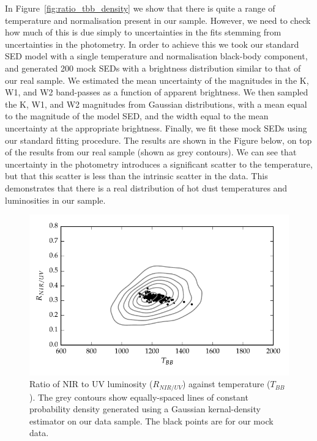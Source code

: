 In Figure~\ref{fig:ratio_tbb_density} we show that there is quite a range of temperature and normalisation present in our sample. 
However, we need to check how much of this is due simply to uncertainties in the fits stemming from uncertainties in the photometry. 
In order to achieve this we took our standard SED model with a single temperature and normalisation black-body component, and generated 200 mock SEDs with a brightness distribution similar to that of our real sample. 
We estimated the mean uncertainty of the magnitudes in the K, W1, and W2 band-passes as a function of apparent brightness. 
We then sampled the K, W1, and W2 magnitudes from Gaussian distributions, with a mean equal to the magnitude of the model SED, and the width equal to the mean uncertainty at the appropriate brightness. 
Finally, we fit these mock SEDs using our standard fitting procedure. 
The results are shown in the Figure below, on top of the results from our real sample (shown as grey contours). 
We can see that uncertainty in the photometry introduces a significant scatter to the temperature, but that this scatter is less than the intrinsic scatter in the data. 
This demonstrates that there is a real distribution of hot dust temperatures and luminosities in our sample. 

\begin{figure}
  \centering
  \includegraphics[width=\textwidth]{figures/chapter05/ratio_tbb_contours.pdf}
  \caption{Ratio of NIR to UV luminosity ($R_{NIR/UV}$) against temperature ($T_{BB}$). The grey contours show equally-spaced lines of constant probability density generated using a Gaussian kernal-density estimator on our data sample. The black points are for our mock data.}
  \label{fig:}
\end{figure}

